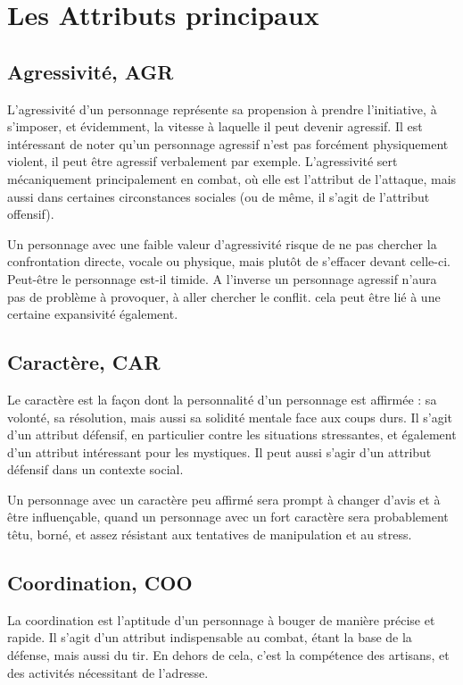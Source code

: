 \documentclass[10pt,a4paper,twocolumn]{book}
\begin{document}
\section{Les Attributs principaux}
\subsection{Agressivité, AGR}
L'agressivité d'un personnage représente sa propension à prendre l'initiative, à s'imposer, et évidemment, la vitesse à laquelle il peut devenir agressif. Il est intéressant de noter qu'un personnage agressif n'est pas forcément physiquement violent, il peut être agressif verbalement par exemple. L'agressivité sert mécaniquement principalement en combat, où elle est l'attribut de l'attaque, mais aussi dans certaines circonstances sociales (ou de même, il s'agit de l'attribut offensif).

Un personnage avec une faible valeur d'agressivité risque de ne pas chercher la confrontation directe, vocale ou physique, mais plutôt de s'effacer devant celle-ci. Peut-être le personnage est-il timide. A l'inverse un personnage agressif n'aura pas de problème à provoquer, à aller chercher le conflit. cela peut être lié à une certaine expansivité également.
\subsection{Caractère, CAR}
Le caractère est la façon dont la personnalité d'un personnage est affirmée : sa volonté, sa résolution, mais aussi sa solidité mentale face aux coups durs. Il s'agit d'un attribut défensif, en particulier contre les situations stressantes, et également d'un attribut intéressant pour les mystiques. Il peut aussi s'agir d'un attribut défensif dans un contexte social.

Un personnage avec un caractère peu affirmé sera prompt à changer d'avis et à être influençable, quand un personnage avec un fort caractère sera probablement têtu, borné, et assez résistant aux tentatives de manipulation et au stress.
\subsection{Coordination, COO}
La coordination est l'aptitude d'un personnage à bouger de manière précise et rapide. Il s'agit d'un attribut indispensable au combat, étant la base de la défense, mais aussi du tir. En dehors de cela, c'est la compétence des artisans, et des activités nécessitant de l'adresse.
\end{document}
